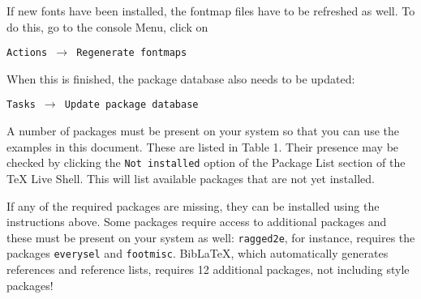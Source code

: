 \documentclass[12pt, a4paper]{article}
\begin{document}
If new fonts have been installed, the fontmap files have to be refreshed as well. To do this, go to the console Menu, click on 


\begin{flushleft}
\texttt{Actions $\rightarrow$ Regenerate fontmaps}
\end{flushleft}


\begin{flushleft}
When this is finished, the package database also needs to be updated: 
\end{flushleft}


\begin{flushleft}
\texttt{Tasks $\rightarrow$ Update package database}
\end{flushleft}


A number of packages must be present on your system so that you can use the examples in this document. These are listed in Table 1. Their presence may be checked by clicking the \texttt{Not installed} option of the Package List section of the TeX Live Shell. This will list available packages that are not yet installed. 

If any of the required packages are missing, they can be installed using the instructions above. Some packages require access to additional packages and these must be present on your system as well: \texttt{ragged2e}, for instance, requires the packages \texttt{everysel} and \texttt{footmisc}. BibLaTeX, which automatically generates references and reference lists, requires 12 additional packages, not including style packages!
\end{document}
